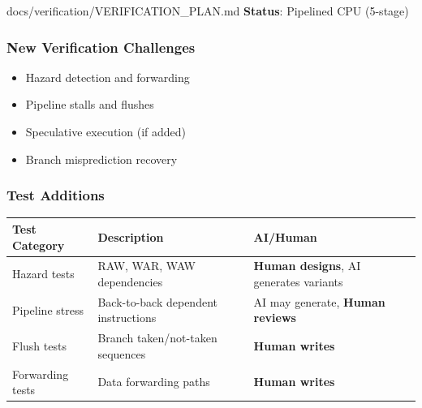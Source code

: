 \begin{relocated}{docs/verification/VERIFICATION_PLAN.md}
\textbf{Status}: Pipelined CPU (5-stage)

\subsubsection{New Verification Challenges}\label{ds:ch:verification-plan:new-verification-challenges}

\begin{itemize}
\tightlist
\item
  Hazard detection and forwarding
\item
  Pipeline stalls and flushes
\item
  Speculative execution (if added)
\item
  Branch misprediction recovery
\end{itemize}

\subsubsection{Test Additions}\label{ds:ch:verification-plan:test-additions}

{
\begin{longtable}[]{@{}
  >{\centering\arraybackslash}p{}
  >{\centering\arraybackslash}p{}
  >{\centering\arraybackslash}p{}@{}}
\toprule\noalign{}
\begin{minipage}[b]{\linewidth}\centering
Test Category
\end{minipage} & \begin{minipage}[b]{\linewidth}\centering
Description
\end{minipage} & \begin{minipage}[b]{\linewidth}\centering
AI/Human
\end{minipage} \\
\midrule\noalign{}
\endhead
\bottomrule\noalign{}
\endlastfoot
Hazard tests & RAW, WAR, WAW dependencies & \textbf{Human designs}, AI
generates variants \\
Pipeline stress & Back-to-back dependent instructions & AI may generate,
\textbf{Human reviews} \\
Flush tests & Branch taken/\allowbreak{}not-taken sequences &
\textbf{Human writes} \\
Forwarding tests & Data forwarding paths & \textbf{Human writes} \\
\end{longtable}
}


\end{relocated}
